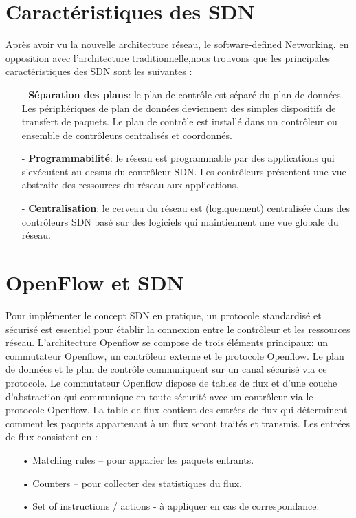 \section{Caractéristiques des SDN}
Après avoir vu la nouvelle architecture réseau, le software-defined Networking, en opposition avec l'architecture traditionnelle,nous trouvons que les principales caractéristiques des SDN sont les suivantes :\\
\begin{itemize}
\item[-]\textbf{Séparation des plans}: le plan de contrôle est séparé du plan de données. Les périphériques de plan de données deviennent des simples dispositifs de transfert de paquets. Le plan de contrôle est installé dans un contrôleur ou ensemble de contrôleurs centralisés et coordonnés.\\
\item[-]\textbf{Programmabilité}: le réseau est programmable par des applications qui s’exécutent au-dessus du contrôleur SDN. Les contrôleurs présentent une vue abstraite des ressources du réseau aux applications.\\
\item[-]\textbf{Centralisation}: le cerveau du réseau est (logiquement) centralisée dans des contrôleurs SDN basé sur des logiciels qui maintiennent une vue globale du réseau.
\end{itemize}

\section{OpenFlow et SDN}
\label{S_OpenFlow}
Pour implémenter le concept SDN en pratique, un protocole standardisé et sécurisé est essentiel  pour établir la connexion entre le contrôleur et les ressources réseau. L’architecture Openflow se compose de trois éléments principaux: un commutateur Openflow, un contrôleur externe et le protocole Openflow. Le plan de données et le plan de contrôle communiquent sur un canal sécurisé via ce protocole. Le commutateur Openflow dispose de tables de flux et d’une couche d’abstraction qui communique en toute sécurité avec un contrôleur via le protocole Openflow. La table de flux contient des entrées de flux qui déterminent comment les paquets appartenant à un flux seront traités et transmis. 
Les entrées de flux consistent en :\\

\begin{itemize}
\item[•] Matching rules – pour apparier les paquets entrants.
\item[•] Counters – pour collecter des statistiques du flux.
\item[•] Set of instructions / actions - à appliquer en cas de correspondance.\\
\end{itemize}

